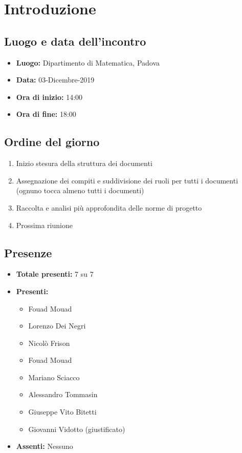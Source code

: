\section*{Introduzione}

\subsection*{Luogo e data dell'incontro}
	\begin{itemize}
		\item \textbf{Luogo:} Dipartimento di Matematica, Padova
		\item \textbf{Data:} 03-Dicembre-2019
		\item \textbf{Ora di inizio:} 14:00
		\item \textbf{Ora di fine:} 18:00
	\end{itemize}

\subsection*{Ordine del giorno}
	\begin{enumerate}
		\item Inizio stesura della struttura dei documenti
		\item Assegnazione dei compiti e suddivisione dei ruoli per tutti i documenti (ognuno tocca almeno tutti i documenti)
		\item Raccolta e analisi più approfondita delle norme di progetto
		\item Prossima riunione
	\end{enumerate}

\subsection*{Presenze}
	\begin{itemize}
		\item \textbf{Totale presenti:} 7 su 7
		\item \textbf{Presenti: }
			\begin{itemize}			
				\item Fouad Mouad
				\item Lorenzo Dei Negri
				\item Nicolò Frison
				\item Fouad Mouad
				\item Mariano Sciacco
				\item Alessandro Tommasin
				\item Giuseppe Vito Bitetti
				\item Giovanni Vidotto (giustificato)
			\end{itemize}
		\item \textbf{Assenti: } 
			Nessuno
	\end{itemize}


